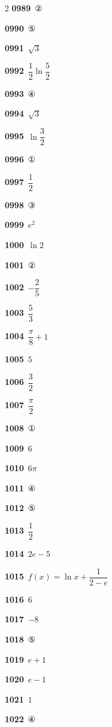 \documentclass[10pt,a4paper]{article}
\begin{document}
\begin{multicols}{2}
\noindent\textbf{0989}\ ②\par
\noindent\textbf{0990}\ ⑤\par
\noindent\textbf{0991}\ $\sqrt{3}$\par
\noindent\textbf{0992}\ $\dfrac{1}{2}\ln\dfrac{5}{2}$\par
\noindent\textbf{0993}\ ④\par
\noindent\textbf{0994}\ $\sqrt{3}$\par
\noindent\textbf{0995}\ $\ln\dfrac{3}{2}$\par
\noindent\textbf{0996}\ ①\par
\noindent\textbf{0997}\ $\dfrac{1}{2}$\par
\noindent\textbf{0998}\ ③\par
\noindent\textbf{0999}\ $e^2$\par
\noindent\textbf{1000}\ $\ln 2$\par
\noindent\textbf{1001}\ ②\par
\noindent\textbf{1002}\ $-\dfrac{2}{5}$\par
\noindent\textbf{1003}\ $\dfrac{5}{3}$\par
\noindent\textbf{1004}\ $\dfrac{\pi}{8}+1$\par
\noindent\textbf{1005}\ $5$\par
\noindent\textbf{1006}\ $\dfrac{3}{2}$\par
\noindent\textbf{1007}\ $\dfrac{\pi}{2}$\par
\noindent\textbf{1008}\ ①\par
\noindent\textbf{1009}\ $6$\par
\noindent\textbf{1010}\ $6\pi$\par
\noindent\textbf{1011}\ ④\par
\noindent\textbf{1012}\ ⑤\par
\noindent\textbf{1013}\ $\dfrac{1}{2}$\par
\noindent\textbf{1014}\ $2e-5$\par
\noindent\textbf{1015}\ $f(x)=\ln x+\dfrac{1}{2-e}$\par
\noindent\textbf{1016}\ $6$\par
\noindent\textbf{1017}\ $-8$\par
\noindent\textbf{1018}\ ⑤\par
\noindent\textbf{1019}\ $e+1$\par
\noindent\textbf{1020}\ $e-1$\par
\noindent\textbf{1021}\ $1$\par
\noindent\textbf{1022}\ ④\par

\end{multicols}
\end{document}
